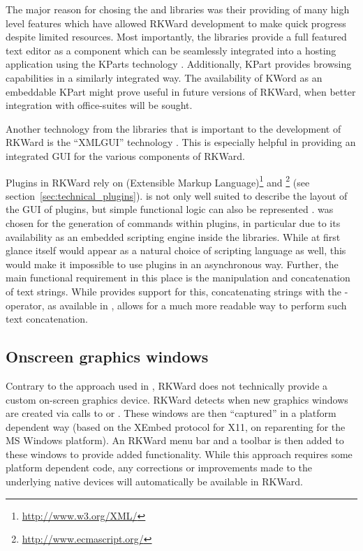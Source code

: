 The major reason for chosing the  and  libraries was their providing 
of many high level features which have allowed RKWard development to make quick
progress despite limited resources. Most importantly, the  libraries provide a
full featured text editor \citep{CullmannND} as a component which can be
seamlessly integrated into a hosting application using the KParts technology
\citep{Faure2000}. Additionally, KPart provides  browsing capabilities in a
similarly integrated way. The availability of KWord \citep{KWord} as an
embeddable KPart might prove useful in future versions of RKWard, when better
integration with office-suites will be sought.

Another technology from the  libraries that is important to the development
of RKWard is the ``XMLGUI'' technology
\citep{Faure2000}. This is especially helpful in providing an integrated GUI for
the various components of RKWard.

Plugins in RKWard rely on  (Extensible Markup Language)\footnote{\url{http://www.w3.org/XML/}}
and \footnote{\url{http://www.ecmascript.org/}} (see section~\ref{sec:technical_plugins}).  is not
only well suited to describe the layout of the GUI of plugins, but simple
functional logic can also be represented \citep{Visne2009}.  was
chosen for the generation of  commands within plugins, in particular due to its
availability as an embedded scripting engine inside the  libraries. While at
first glance  itself would appear as a natural choice of scripting language as
well, this would make it impossible to use plugins in an asynchronous way.
Further, the main functional requirement in this place is the manipulation and
concatenation of text strings. While  provides support for this, concatenating
strings with the \code{+}-operator, as available in , allows for a much
more readable way to perform such text concatenation.

\subsection{Onscreen graphics windows}
\label{sec:technical_graphics}
Contrary to the approach used in  \citep{HelbigTheus2005}, RKWard does
not technically provide a custom on-screen graphics device. RKWard detects when
new graphics windows are created via calls to  or . These windows
are then ``captured'' in a platform dependent way (based on the XEmbed \citep{Ettrich2002} protocol
for X11, on reparenting for the MS Windows platform). An RKWard menu bar and a
toolbar is then added to these windows to provide added functionality. While
this approach requires some platform dependent code, any corrections or
improvements made to the underlying  native devices will automatically be
available in RKWard.

